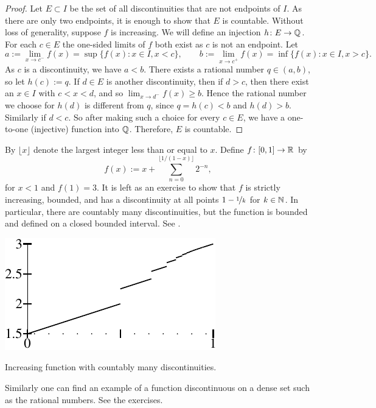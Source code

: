 \begin{proof}
Let $E \subset I$ be the set of all discontinuities
that are not endpoints of $I$.  As there are
only two endpoints, it is enough to show that $E$ is countable.
Without loss of generality, suppose $f$ is increasing.
We will define an injection $h \colon E \to {\mathbb{Q}}$.
For each $c \in E$
the one-sided limits of $f$ both exist as $c$ is not an endpoint.
Let
\begin{equation*}
a := \lim_{x \to c^-} f(x) = \sup \{ f(x) : x \in I, x < c \} ,
\qquad
b := \lim_{x \to c^+} f(x) = \inf \{ f(x) : x \in I, x > c \} .
\end{equation*}
As $c$ is a discontinuity, we have $a < b$.  
There exists a rational number $q \in (a,b)$, so let $h(c) := q$.
If $d \in E$ is another discontinuity, then if $d > c$, then there
exist an $x \in I$ with $c < x < d$, and so $\lim_{x \to d^-} f(x) \geq b$.
Hence the rational number we choose for $h(d)$ is different from $q$,
since $q=h(c) < b$ and $h(d) > b$.
Similarly if $d < c$.  So after making such a choice for
every $c \in E$, we have a 
one-to-one (injective) function into ${\mathbb{Q}}$.  Therefore, $E$ is countable.
\end{proof}

\begin{example} \label{example:countdiscont}
By $\lfloor x \rfloor$ denote the largest integer less than or equal to $x$.
Define $f \colon [0,1] \to {\mathbb{R}}$ by
\begin{equation*}
f(x) :=
x +
\sum_{n=0}^{\lfloor 1/(1-x) \rfloor}
2^{-n} ,
\end{equation*}
for $x < 1$ and $f(1) = 3$.
It is left as an exercise to show that $f$ is strictly increasing, bounded, and
has a discontinuity at all points $1-\nicefrac{1}{k}$ for $k \in {\mathbb{N}}$.  In particular,
there are countably many discontinuities, but the function is bounded and
defined on a closed bounded interval.  See .
\begin{myfigureht}
\includegraphics{figures/increasing-discont-fig}
\caption{Increasing function with countably many
discontinuities.\label{fig:countdiscont}}
\end{myfigureht}

Similarly one can find an example of a function discontinuous on a dense set
such as the rational numbers.  See the exercises.
\end{example}


